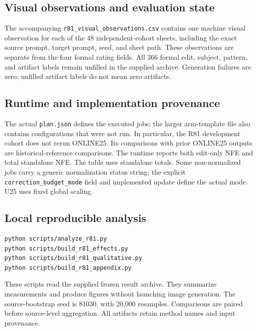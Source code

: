 \subsection{Visual observations and evaluation state}
The accompanying \texttt{r81\_visual\_observations.csv} contains one machine visual observation for each of the 48 independent-cohort sheets, including the exact source prompt, target prompt, seed, and sheet path. These observations are separate from the four formal rating fields. All 366 formal edit, subject, pattern, and artifact labels remain unfilled in the supplied archive. Generation failures are zero; unfilled artifact labels do not mean zero artifacts.

\subsection{Runtime and implementation provenance}
The actual \texttt{plan.json} defines the executed jobs; the larger arm-template file also contains configurations that were not run. In particular, the R81 development cohort does not rerun ONLINE25. Its comparisons with prior ONLINE25 outputs are historical-reference comparisons. The runtime reports both edit-only NFE and total standalone NFE. The table uses standalone totals. Some non-normalized jobs carry a generic normalization status string; the explicit \texttt{correction\_budget\_mode} field and implemented update define the actual mode. U25 uses fixed global scaling.

\subsection{Local reproducible analysis}
\begin{verbatim}
python scripts/analyze_r81.py
python scripts/build_r81_effects.py
python scripts/build_r81_qualitative.py
python scripts/build_r81_appendix.py
\end{verbatim}
These scripts read the supplied frozen result archive. They summarize measurements and produce figures without launching image generation. The source-bootstrap seed is 81030, with 20,000 resamples. Comparisons are paired before source-level aggregation. All artifacts retain method names and input provenance.

